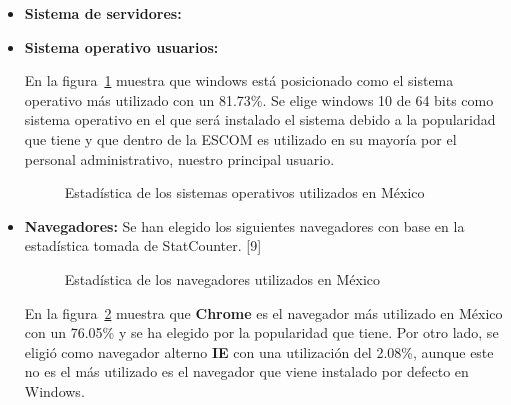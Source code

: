 		\begin{itemize}
			\item \textbf{Sistema de servidores:}
			
			\item \textbf{Sistema operativo usuarios:} 
			
			En la figura~\ref{fig:so} muestra que windows está posicionado como el sistema operativo más utilizado con un 81.73\%. Se elige windows 10 de 64 bits como sistema operativo en el que será instalado el sistema debido a la popularidad que tiene y que dentro de la ESCOM es utilizado en su mayoría por el personal administrativo, nuestro principal usuario.
			
			\begin{figure}[htbp!]
				\begin{center}
					\caption{Estadística de los sistemas operativos utilizados en México}
					\label{fig:so}
				\end{center}
			\end{figure}
		
			\item \textbf{Navegadores:} Se han elegido los siguientes navegadores con base en la estadística tomada de StatCounter. [9] 
			
			\begin{figure}[htbp!]
				\begin{center}
					\caption{Estadística de los navegadores utilizados en México}
					\label{fig:navegadores}
				\end{center}
			\end{figure}
			
			En la figura~\ref{fig:navegadores} muestra que \textbf{Chrome} es el navegador más utilizado en México con un 76.05\% y se ha elegido por la popularidad que tiene. Por otro lado, se eligió como navegador alterno \textbf{IE} con una utilización del 2.08\%, aunque este no es el más utilizado es el navegador que viene instalado por defecto en Windows.
		\end{itemize}
	
